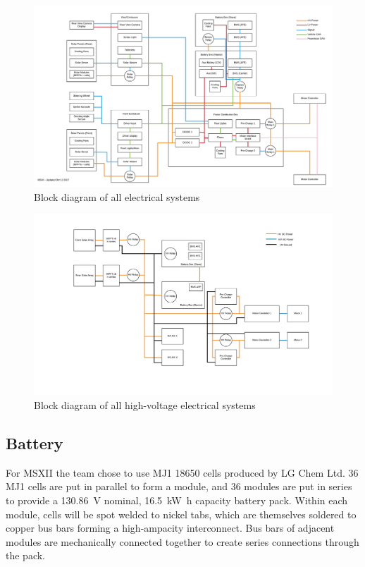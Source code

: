 \documentclass[10pt]{article}
\begin{document}
\begin{figure}
\centering
\includegraphics[width=\textwidth]{figures/msxii-electrical-full-block-diagram}
\caption{Block diagram of all electrical systems}
\label{fig:msxii-electrical-full-block-diagram}
\end{figure}

\begin{figure}
\centering
\includegraphics[width=\textwidth]{figures/msxii-electrical-hv-block-diagram}
\caption{Block diagram of all high-voltage electrical systems}
\label{fig:msxii-electrical-hv-block-diagram}
\end{figure}


\subsection{Battery}
For MSXII the team chose to use MJ1 18650 cells produced by LG Chem Ltd. 36 MJ1 cells are put in parallel to form a module, and 36 modules are put in series to provide a \SI{130.86}{\volt} nominal, \SI{16.5}{\kilo\watt\hour} capacity battery pack. Within each module, cells will be spot welded to nickel tabs, which are themselves soldered to copper bus bars forming a high-ampacity interconnect. Bus bars of adjacent modules are mechanically connected together to create series connections through the pack.
\end{document}
